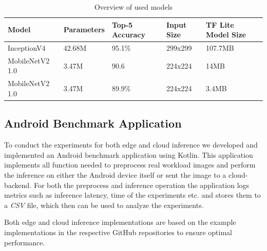 \begin{table}[]
\caption{Overview of used models}
\label{table:modelOverview}
\begin{tabular}{@{}lllll@{}}
\toprule
Model & Parameters & Top-5 Accuracy\cite{modelspecs} & Input Size & TF Lite Model Size \\
\midrule
InceptionV4 & 42.68M & 95.1\% & 299x299 & 107.7MB \\
MobileNetV2 1.0 & 3.47M\cite{DBLP:journals/corr/abs-1801-04381} & 90.6 & 224x224 & 14MB \\
MobileNetV2 1.0 & 3.47M\cite{DBLP:journals/corr/abs-1801-04381} & 89.9\% & 224x224 & 3.4MB\\
\bottomrule
\end{tabular}
\end{table}


\subsection{Android Benchmark Application}
To conduct the experiments for both edge and cloud inference we developed and implemented an Android benchmark application using Kotlin.
This application implements all function needed to preprocess real workload images and perform the inference on either the Android device itself or sent the image to a cloud-backend.
For both the preprocess and inference operation the application logs metrics such as inference latency, time of the experiments etc. and stores them to a \emph{CSV} file, which then can be used to analyze the experiments.

Both edge and cloud inference implementations are based on the example implementations in the respective GitHub repositories to ensure optimal performance. 

